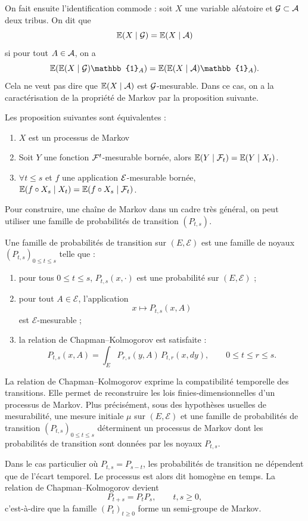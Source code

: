 On fait ensuite l'identification commode : soit $X$ une variable aléatoire et $\mathcal{G} \subset \mathcal{A}$ deux tribus. On dit que
\[
	\mathbb{E}(X \mid \mathcal{G}) = \mathbb{E}(X \mid \mathcal{A})
\]
si pour tout $A \in \mathcal{A}$, on a
\[
	\E(\E(X \mid \aG)\mathbb{1}_A) = \E(\E(X \mid \aA)\mathbb{1}_A).
\]
Cela ne veut pas dire que $\mathbb{E}(X \mid \mathcal{A})$ est $\mathcal{G}$-mesurable. Dans ce cas, on a la caractérisation de la propriété de Markov par la proposition suivante.

\begin{prop}{}{}
	Les proposition suivantes sont équivalentes :
	\begin{enumerate}
		\item $X$ est un processus de Markov
		\item Soit $Y$ une fonction $\mathcal{F}^t$-mesurable bornée, alors $\mathbb{E}(Y \mid \mathcal{F}_t) = \mathbb{E}(Y \mid X_t)$.
		\item $\forall t \le s$ et $f$ une application $\mathcal{E}$-mesurable bornée, $\mathbb{E}(f\circ X_s \mid X_t) = \mathbb{E}(f\circ X_s \mid \mathcal{F}_t)$.
	\end{enumerate}
\end{prop}

Pour construire, une chaîne de Markov dans un cadre très général, on peut utiliser une famille de probabilités de transition $(P_{t,s})$.

\begin{defn}{}{}
	Une famille de probabilités de transition sur $(E,\mathcal E)$ est une famille de noyaux
	$(P_{t,s})_{0\le t\le s}$
	telle que :

	\begin{enumerate}
		\item pour tous $0\le t\le s$, $P_{t,s}(x,\cdot)$ est une probabilité sur $(E,\mathcal E)$ ;

		\item pour tout $A\in\mathcal E$, l'application
		      \[
			      x\longmapsto P_{t,s}(x,A)
		      \]
		      est $\mathcal E$-mesurable ;

		\item la relation de Chapman--Kolmogorov est satisfaite :
		      \[
			      P_{t,s}(x,A)
			      =
			      \int_E P_{r,s}(y,A)\,P_{t,r}(x,dy),
			      \qquad 0\le t\le r\le s.
		      \]
	\end{enumerate}
\end{defn}

La relation de Chapman--Kolmogorov exprime la compatibilité temporelle des transitions. Elle permet de reconstruire les lois finies-dimensionnelles d'un processus de Markov. Plus précisément, sous des hypothèses usuelles de mesurabilité, une mesure initiale $\mu$ sur $(E,\mathcal E)$ et une famille de probabilités de transition $(P_{t,s})_{0\le t\le s}$ déterminent un processus de Markov dont les probabilités de transition sont données par les noyaux $P_{t,s}$.

\medskip

Dans le cas particulier où $P_{t,s}=P_{s-t}$,
les probabilités de transition ne dépendent que de l'écart temporel. Le processus est alors dit homogène en temps. La relation de Chapman--Kolmogorov devient
\[
	P_{t+s}=P_tP_s,
	\qquad t,s\ge0,
\]
c'est-à-dire que la famille $(P_t)_{t\ge0}$ forme un semi-groupe de Markov.
